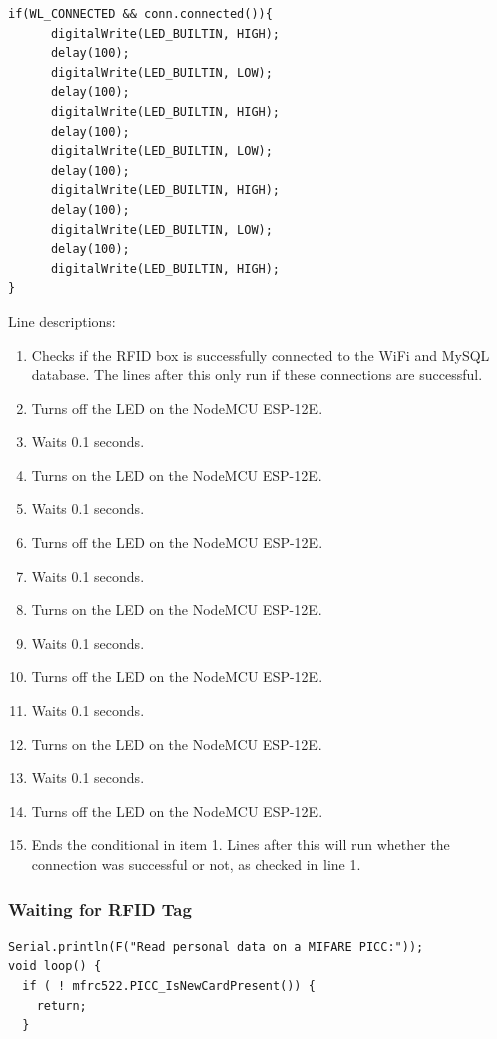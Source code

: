 \documentclass[12pt]{article}
\begin{document}
\begin{spacing}{1.2}
\begin{lstlisting}[language=Arduino]  
if(WL_CONNECTED && conn.connected()){
      digitalWrite(LED_BUILTIN, HIGH);  
      delay(100);                       
      digitalWrite(LED_BUILTIN, LOW);    
      delay(100);                      
      digitalWrite(LED_BUILTIN, HIGH);  
      delay(100); 
      digitalWrite(LED_BUILTIN, LOW);   
      delay(100);                      
      digitalWrite(LED_BUILTIN, HIGH);  
      delay(100); 
      digitalWrite(LED_BUILTIN, LOW);   
      delay(100);                      
      digitalWrite(LED_BUILTIN, HIGH);  
}
\end{lstlisting}

Line descriptions:
\begin{enumerate}
	\item Checks if the RFID box is successfully connected to the WiFi and MySQL database. The lines after this only run if these connections are successful.
	\item Turns off the LED on the NodeMCU ESP-12E.
	\item Waits 0.1 seconds.
	\item Turns on the LED on the NodeMCU ESP-12E.
	\item Waits 0.1 seconds.
	\item Turns off the LED on the NodeMCU ESP-12E.
	\item Waits 0.1 seconds.
	\item Turns on the LED on the NodeMCU ESP-12E.
	\item Waits 0.1 seconds.
	\item Turns off the LED on the NodeMCU ESP-12E.
	\item Waits 0.1 seconds.
	\item Turns on the LED on the NodeMCU ESP-12E.
	\item Waits 0.1 seconds.
	\item Turns off the LED on the NodeMCU ESP-12E.
	\item Ends the conditional in item 1. Lines after this will run whether the connection was successful or not, as checked in line 1.
\end{enumerate}

\subsubsection{Waiting for RFID Tag}

\begin{lstlisting}[language=Arduino]  
Serial.println(F("Read personal data on a MIFARE PICC:")); 
void loop() {
  if ( ! mfrc522.PICC_IsNewCardPresent()) {
    return;
  }


\end{lstlisting}
\end{spacing}
\end{document}
